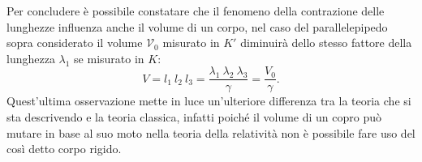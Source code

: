  Per concludere è possibile constatare che il fenomeno della contrazione delle lunghezze influenza anche il volume di un corpo, nel caso del parallelepipedo sopra considerato il volume $\mathcal{V}_0$ misurato in $K'$ diminuirà dello stesso fattore della lunghezza $\lambda_1$ se misurato in $K$:
 \begin{equation}
    V=l_1\ l_2\ l_3=\frac{\lambda_1\ \lambda_2\ \lambda_3}{\gamma}=\frac{V_0}{\gamma}.
    \label{contrazioneVolumi}
 \end{equation}
 Quest'ultima osservazione mette in luce un'ulteriore differenza tra la teoria che si sta descrivendo e la teoria classica, infatti poiché il volume di un copro può mutare in base al suo moto nella teoria della relatività non è possibile fare uso del così detto corpo rigido.
